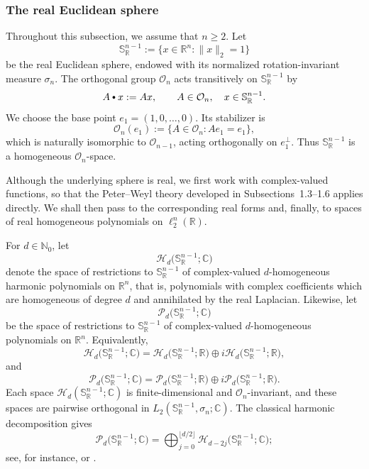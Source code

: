 \documentclass[11pt,showkeys]{amsart}
\newcommand{\hbullet}{\mathbin{\vcenter{\hbox{\scalebox{0.7}{$\bullet$}}}}}
\begin{document}
\subsubsection{The real Euclidean sphere}
\label{sec:real-sphere}

Throughout this subsection, we assume that $n\geq 2$. Let
\[
\mathbb S_{\mathbb R}^{n-1}
:=
\bigl\{x\in\mathbb R^n:\|x\|_2=1\bigr\}
\]
be the real Euclidean sphere, endowed with its normalized rotation-invariant
measure $\sigma_n$. The orthogonal group $\mathcal O_n$ acts transitively on
$\mathbb S_{\mathbb R}^{n-1}$ by
\[
A\hbullet x:=Ax,
\qquad
A\in\mathcal O_n,\quad x\in\mathbb S_{\mathbb R}^{n-1}.
\]
We choose the base point $e_1=(1,0,\ldots,0)$. Its stabilizer is
\[
\mathcal O_n(e_1)
:=
\bigl\{A\in\mathcal O_n:Ae_1=e_1\bigr\},
\]
which is naturally isomorphic to $\mathcal O_{n-1}$, acting orthogonally on
$e_1^\perp$. Thus $\mathbb S_{\mathbb R}^{n-1}$ is a homogeneous
$\mathcal O_n$-space.

Although the underlying sphere is real, we first work with complex-valued
functions, so that the Peter--Weyl theory developed in
Subsections~1.3--1.6 applies directly. We shall then pass to the corresponding
real forms and, finally, to spaces of real homogeneous polynomials on
$\ell_2^n(\mathbb R)$.

For $d\in\mathbb N_0$, let
\[
\mathcal H_d\bigl(\mathbb S_{\mathbb R}^{n-1};\mathbb C\bigr)
\]
denote the space of restrictions to $\mathbb S_{\mathbb R}^{n-1}$ of
complex-valued $d$-homogeneous harmonic polynomials on $\mathbb R^n$, that is,
polynomials with complex coefficients which are homogeneous of degree $d$ and
annihilated by the real Laplacian. Likewise, let
\[
\mathcal P_d\bigl(\mathbb S_{\mathbb R}^{n-1};\mathbb C\bigr)
\]
be the space of restrictions to $\mathbb S_{\mathbb R}^{n-1}$ of
complex-valued $d$-homogeneous polynomials on $\mathbb R^n$. Equivalently,
\[
\mathcal H_d\bigl(\mathbb S_{\mathbb R}^{n-1};\mathbb C\bigr)
=
\mathcal H_d\bigl(\mathbb S_{\mathbb R}^{n-1};\mathbb R\bigr)
\oplus
i\mathcal H_d\bigl(\mathbb S_{\mathbb R}^{n-1};\mathbb R\bigr),
\]
and
\[
\mathcal P_d\bigl(\mathbb S_{\mathbb R}^{n-1};\mathbb C\bigr)
=
\mathcal P_d\bigl(\mathbb S_{\mathbb R}^{n-1};\mathbb R\bigr)
\oplus
i\mathcal P_d\bigl(\mathbb S_{\mathbb R}^{n-1};\mathbb R\bigr).
\]
Each space $\mathcal H_d(\mathbb S_{\mathbb R}^{n-1};\mathbb C)$ is
finite-dimensional and $\mathcal O_n$-invariant, and these spaces are pairwise
orthogonal in $L_2(\mathbb S_{\mathbb R}^{n-1},\sigma_n;\mathbb C)$. The
classical harmonic decomposition gives
\begin{equation}
\label{eq:P-d-harmonic-decomposition}
\mathcal P_d\bigl(\mathbb S_{\mathbb R}^{n-1};\mathbb C\bigr)
=
\bigoplus_{j=0}^{\lfloor d/2\rfloor}
\mathcal H_{d-2j}\bigl(\mathbb S_{\mathbb R}^{n-1};\mathbb C\bigr);
\end{equation}
see, for instance,
\cite[Theorem~2.18]{atkinson2012spherical}  or \cite[Proposition~2.2]{defant2026minimal}.
\end{document}
